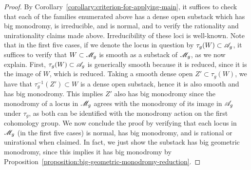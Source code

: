 \begin{proof}
By Corollary~\ref{corollary:criterion-for-applying-main}, it suffices to check that each of the families enumerated above has a dense open substack which has big monodromy, is irreducible, and is normal, and to verify the rationality and unirationality claims made above.
Irreducibility of these loci is well-known.
Note that in the first five cases, if we denote the locus in question by $\tau_g(W) \subset {\mathscr A_g}$, it suffices to verify that $W \subset {\mathscr M_g}$ is smooth as a substack of ${\mathscr M_g}$, as we now explain.
First, $\tau_g(W) \subset {\mathscr A_g}$ is generically smooth because it is reduced, since it is the image of $W$, which is reduced.
Taking a smooth dense open $Z' \subset \tau_g(W)$, we have that $\tau_g^{-1}(Z') \subset W$ is a dense open substack, hence it is also
smooth and has big monodromy. This implies $Z'$ also has big monodromy since the monodromy of a locus in ${\mathscr M_g}$ agrees with the monodromy of its image in ${\mathscr A_g}$ under $\tau_g$, as both can be identified with the monodromy action on
the first cohomology group.
We now conclude the proof by verifying that each locus in ${\mathscr M_g}$ (in the first five cases) is normal, has big monodromy, and is rational or unirational when claimed. In fact, we just show the
substack has big geometric monodromy, since this implies it has big monodromy by
Proposition~\ref{proposition:big-geometric-monodromy-reduction}.


\end{proof}
